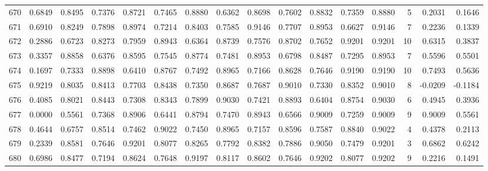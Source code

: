 \begin{tabular}{lrrrrrrrrrrrrrrr}
670 &      0.6849 &  0.8495 &  0.7376 &  0.8721 &  0.7465 &  0.8880 &  0.6362 &  0.8698 &  0.7602 &  0.8832 &   0.7359 &     0.8880 &      5 &                    0.2031 &                     0.1646 \\
671 &      0.6910 &  0.8249 &  0.7898 &  0.8974 &  0.7214 &  0.8403 &  0.7585 &  0.9146 &  0.7707 &  0.8953 &   0.6627 &     0.9146 &      7 &                    0.2236 &                     0.1339 \\
672 &      0.2886 &  0.6723 &  0.8273 &  0.7959 &  0.8943 &  0.6364 &  0.8739 &  0.7576 &  0.8702 &  0.7652 &   0.9201 &     0.9201 &     10 &                    0.6315 &                     0.3837 \\
673 &      0.3357 &  0.8858 &  0.6376 &  0.8595 &  0.7545 &  0.8774 &  0.7481 &  0.8953 &  0.6798 &  0.8487 &   0.7295 &     0.8953 &      7 &                    0.5596 &                     0.5501 \\
674 &      0.1697 &  0.7333 &  0.8898 &  0.6410 &  0.8767 &  0.7492 &  0.8965 &  0.7166 &  0.8628 &  0.7646 &   0.9190 &     0.9190 &     10 &                    0.7493 &                     0.5636 \\
675 &      0.9219 &  0.8035 &  0.8413 &  0.7703 &  0.8438 &  0.7350 &  0.8687 &  0.7687 &  0.9010 &  0.7330 &   0.8352 &     0.9010 &      8 &                   -0.0209 &                    -0.1184 \\
676 &      0.4085 &  0.8021 &  0.8443 &  0.7308 &  0.8343 &  0.7899 &  0.9030 &  0.7421 &  0.8893 &  0.6404 &   0.8754 &     0.9030 &      6 &                    0.4945 &                     0.3936 \\
677 &      0.0000 &  0.5561 &  0.7368 &  0.8906 &  0.6441 &  0.8794 &  0.7470 &  0.8943 &  0.6566 &  0.9009 &   0.7259 &     0.9009 &      9 &                    0.9009 &                     0.5561 \\
678 &      0.4644 &  0.6757 &  0.8514 &  0.7462 &  0.9022 &  0.7450 &  0.8965 &  0.7157 &  0.8596 &  0.7587 &   0.8840 &     0.9022 &      4 &                    0.4378 &                     0.2113 \\
679 &      0.2339 &  0.8581 &  0.7646 &  0.9201 &  0.8077 &  0.8265 &  0.7792 &  0.8382 &  0.7886 &  0.9050 &   0.7479 &     0.9201 &      3 &                    0.6862 &                     0.6242 \\
680 &      0.6986 &  0.8477 &  0.7194 &  0.8624 &  0.7648 &  0.9197 &  0.8117 &  0.8602 &  0.7646 &  0.9202 &   0.8077 &     0.9202 &      9 &                    0.2216 &                     0.1491 \\

\end{tabular}
